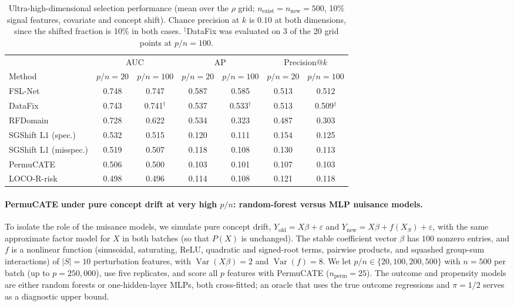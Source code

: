 \begin{table}[t]
\centering
\caption{Ultra-high-dimensional selection performance (mean over the $\rho$ grid; $n_{\text{exist}} = n_{\text{new}} = 500$, 10\% signal features, covariate and concept shift). Chance precision at $k$ is $0.10$ at both dimensions, since the shifted fraction is 10\% in both cases. $^\dagger$DataFix was evaluated on 3 of the 20 grid points at $p/n = 100$.}
\label{tab:uhd_main}
\begin{tabular}{lcccccc}
\toprule
 & \multicolumn{2}{c}{AUC} & \multicolumn{2}{c}{AP} & \multicolumn{2}{c}{Precision@$k$} \\
\cmidrule(lr){2-3}\cmidrule(lr){4-5}\cmidrule(lr){6-7}
Method & $p/n=20$ & $p/n=100$ & $p/n=20$ & $p/n=100$ & $p/n=20$ & $p/n=100$ \\
\midrule
FSL-Net              & 0.748 & 0.747 & 0.587 & 0.585 & 0.513 & 0.512 \\
DataFix              & 0.743 & 0.741$^\dagger$ & 0.537 & 0.533$^\dagger$ & 0.513 & 0.509$^\dagger$ \\
RFDomain             & 0.728 & 0.622 & 0.534 & 0.323 & 0.487 & 0.303 \\
SGShift L1 (spec.)   & 0.532 & 0.515 & 0.120 & 0.111 & 0.154 & 0.125 \\
SGShift L1 (misspec.)& 0.519 & 0.507 & 0.118 & 0.108 & 0.130 & 0.113 \\
PermuCATE            & 0.506 & 0.500 & 0.103 & 0.101 & 0.107 & 0.103 \\
LOCO-R-risk          & 0.498 & 0.496 & 0.114 & 0.108 & 0.121 & 0.118 \\
\bottomrule
\end{tabular}
\end{table}

\paragraph{PermuCATE under pure concept drift at very high $p/n$: random-forest versus MLP nuisance models.}
To isolate the role of the nuisance models, we simulate pure concept drift, $Y_{\text{old}} = X\beta + \varepsilon$ and $Y_{\text{new}} = X\beta + f(X_S) + \varepsilon$, with the same approximate factor model for $X$ in both batches (so that $P(X)$ is unchanged). The stable coefficient vector $\beta$ has $100$ nonzero entries, and $f$ is a nonlinear function (sinusoidal, saturating, ReLU, quadratic and signed-root terms, pairwise products, and squashed group-sum interactions) of $|S| = 10$ perturbation features, with $\operatorname{Var}(X\beta) = 2$ and $\operatorname{Var}(f) = 8$. We let $p/n \in \{20, 100, 200, 500\}$ with $n = 500$ per batch (up to $p = 250{,}000$), use five replicates, and score all $p$ features with PermuCATE ($n_{\text{perm}} = 25$). The outcome and propensity models are either random forests or one-hidden-layer MLPs, both cross-fitted; an oracle that uses the true outcome regressions and $\pi = 1/2$ serves as a diagnostic upper bound.

